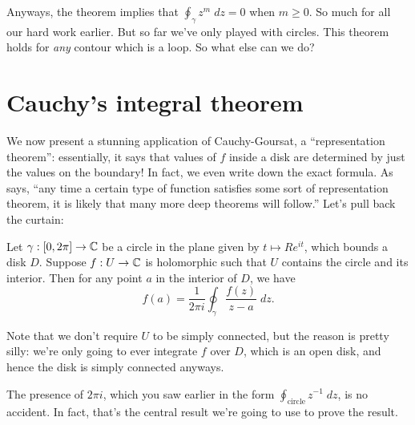 Anyways, the theorem implies that $\oint_\gamma z^m \; dz = 0$ when $m \ge 0$.
So much for all our hard work earlier.
But so far we've only played with circles.
This theorem holds for \emph{any} contour which is a loop.
So what else can we do?

\section{Cauchy's integral theorem}
We now present a stunning application of Cauchy-Goursat, a ``representation theorem'':
essentially, it says that values of $f$ inside a disk
are determined by just the values on the boundary!
In fact, we even write down the exact formula.
As \cite{ref:dartmouth} says,
``any time a certain type of function satisfies some sort of representation theorem,
it is likely that many more deep theorems will follow.''
Let's pull back the curtain:

\begin{theorem}
	Let $\gamma : [0,2\pi] \to \mathbb C$ be a circle in the plane given by $t \mapsto Re^{it}$,
	which bounds a disk $D$.
	Suppose $f : U \to \mathbb C$ is holomorphic such that $U$ contains the circle and its interior.
	Then for any point $a$ in the interior of $D$, we have
	\[ 
		f(a)
		=
		\frac{1}{2\pi i} \oint_\gamma \frac{f(z)}{z-a} \; dz.
	\]
\end{theorem}
Note that we don't require $U$ to be simply connected, but the reason is pretty silly:
we're only going to ever integrate $f$ over $D$, which is an open disk, and hence the disk
is simply connected anyways.

The presence of $2\pi i$, which you saw earlier in the form $\oint_{\text{circle}} z^{-1} \; dz$,
is no accident.
In fact, that's the central result we're going to use to prove the result.


